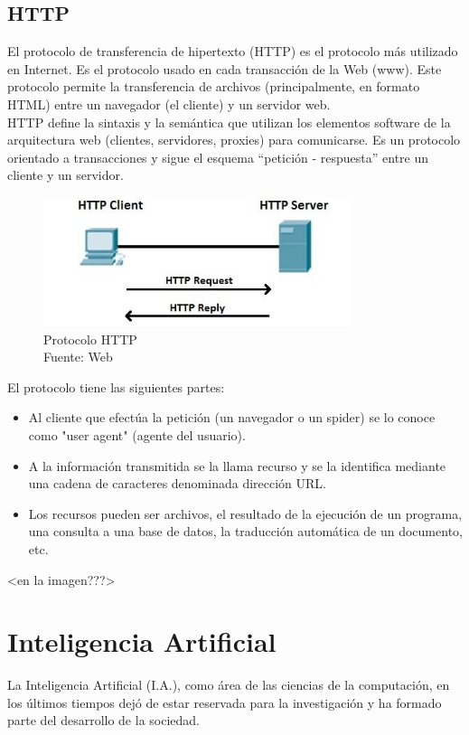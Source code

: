 \subsection{HTTP}
El protocolo de transferencia de hipertexto (HTTP) es el protocolo más utilizado en Internet. Es el protocolo usado en cada transacción de la Web (www). Este protocolo permite la transferencia de archivos (principalmente, en formato HTML) entre un navegador (el cliente) y un servidor web.\\

HTTP define la sintaxis y la semántica que utilizan los elementos software de la arquitectura web (clientes, servidores, proxies) para comunicarse. Es un protocolo orientado a transacciones y sigue el esquema ``petición - respuesta'' entre un cliente y un servidor. 

\begin{figure}[H]
    \begin{center}
        \includegraphics[width=9cm]{img/capitulo_2/http1.jpg}
    \end{center}
    \caption{Protocolo HTTP\\Fuente: Web}
    \label{fig:sistema_video_vigilancia}
\end{figure}


El protocolo tiene las siguientes partes:
\begin{itemize}
    \item Al cliente que efectúa la petición (un navegador o un spider) se lo conoce como "user agent" (agente del usuario). 
    \item A la información transmitida se la llama recurso y se la identifica mediante una cadena de caracteres denominada dirección URL.
    \item Los recursos pueden ser archivos, el resultado de la ejecución de un programa, una consulta a una base de datos, la traducción automática de un documento, etc.
\end{itemize}

<en la imagen???>

\section{Inteligencia Artificial}
La Inteligencia Artificial (I.A.), como área de las ciencias de la computación, en los últimos tiempos dejó de estar reservada para la investigación y ha formado parte del desarrollo de la sociedad.\\

